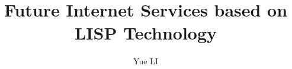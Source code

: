 \title{Future Internet Services based on LISP Technology}


\author{Yue LI}











\degreedate{}

